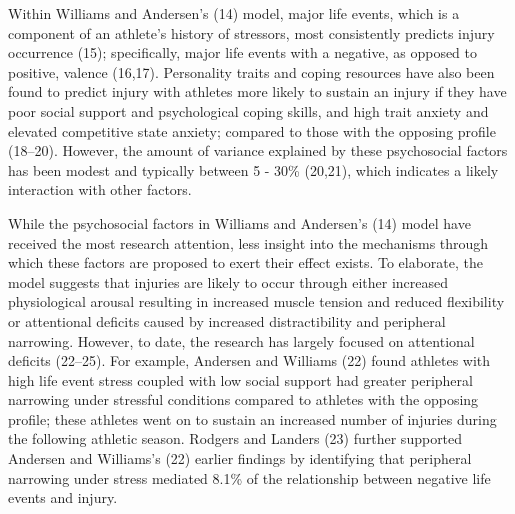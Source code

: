 \documentclass[
  english,
  man]{apa6}
\begin{document}
Within Williams and Andersen's (14) model, major life events, which is a component of an athlete's history of stressors, most consistently predicts injury occurrence (15); specifically, major life events with a negative, as opposed to positive, valence (16,17).
Personality traits and coping resources have also been found to predict injury with athletes more likely to sustain an injury if they have poor social support and psychological coping skills, and high trait anxiety and elevated competitive state anxiety; compared to those with the opposing profile (18--20).
However, the amount of variance explained by these psychosocial factors has been modest and typically between 5 - 30\% (20,21), which indicates a likely interaction with other factors.

While the psychosocial factors in Williams and Andersen's (14) model have received the most research attention, less insight into the mechanisms through which these factors are proposed to exert their effect exists. To elaborate, the model suggests that injuries are likely to occur through either increased physiological arousal resulting in increased muscle tension and reduced flexibility or attentional deficits caused by increased distractibility and peripheral narrowing.
However, to date, the research has largely focused on attentional deficits (22--25).
For example, Andersen and Williams (22) found athletes with high life event stress coupled with low social support had greater peripheral narrowing under stressful conditions compared to athletes with the opposing profile; these athletes went on to sustain an increased number of injuries during the following athletic season. Rodgers and Landers (23) further supported Andersen and Williams's (22) earlier findings by identifying that peripheral narrowing under stress mediated 8.1\% of the relationship between negative life events and injury.
\end{document}
